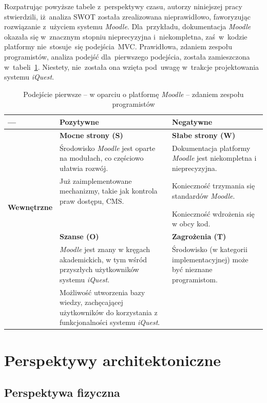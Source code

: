 Rozpatrując powyższe tabele z~perspektywy czasu, autorzy niniejszej pracy stwierdzili, iż~analiza SWOT została zrealizowana nieprawidłowo, faworyzując rozwiązanie z~użyciem systemu \textit{Moodle}. Dla~przykładu, dokumentacja \textit{Moodle} okazała się w~znacznym stopniu nieprecyzyjna i~niekompletna, zaś~w~kodzie platformy nie~stosuje~się podejścia~MVC. Prawidłowa, zdaniem zespołu programistów, analiza podejść dla~pierwszego podejścia, została zamieszczona w~tabeli~\ref{tab:SWOT3}. Niestety, nie~została ona wzięta pod~uwagę w~trakcje projektowania systemu \textit{iQuest}.

\begin{table}[H]
\centering
\begin{tabular}{ | p{2.5cm} | p{5.5cm} | p{5.5cm} | }
\hline
--- & \textbf{Pozytywne} & \textbf{Negatywne} \\ \hline
\multirow{6}{*}{\textbf{Wewnętrzne}} & \textbf{Mocne strony (S)} & \textbf{Słabe strony (W)} \\
			& Środowisko \textit{Moodle} jest oparte na modułach, co częściowo ułatwia rozwój. & Dokumentacja platformy \textit{Moodle}\cite{Man:Moodle} jest niekompletna i nieprecyzyjna. \\
			& Już zaimplementowane mechanizmy, takie jak kontrola praw dostępu, CMS. & Konieczność trzymania się standardów \textit{Moodle}. \\
			& & Konieczność wdrożenia się w obcy kod. \\ \hline
%					
\multirow{3}{*}{\textbf{Zewnętrzne}} & \textbf{Szanse (O)} & \textbf{Zagrożenia (T)} \\
				& \textit{Moodle} jest znany w kręgach akademickich, w tym wśród przyszłych użytkowników systemu \textit{iQuest}. & Środowisko (w kategorii implementacyjnej) może być nieznane programistom. \\
				& Możliwość utworzenia bazy wiedzy, zachęcającej użytkowników do korzystania z funkcjonalności systemu \textit{iQuest}. & \\ \hline
\end{tabular}
\caption{Podejście pierwsze -- w oparciu o platformę \textit{Moodle} -- zdaniem zespołu programistów}\label{tab:SWOT3}
\end{table}

\section{Perspektywy architektoniczne}
\label{Chapter54}

\subsection{Perspektywa fizyczna}
\label{Chapter541}

